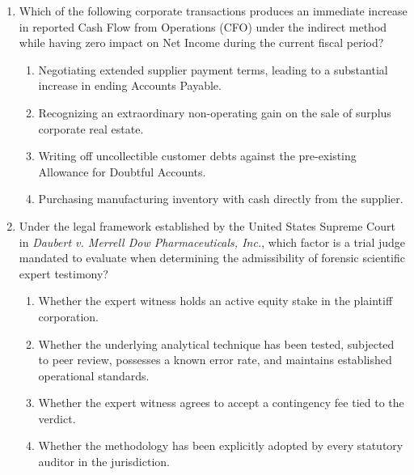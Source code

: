 \begin{enumerate}[label=\textbf{MCQ 3.\arabic*}]
    \item Which of the following corporate transactions produces an immediate increase in reported Cash Flow from Operations (CFO) under the indirect method while having zero impact on Net Income during the current fiscal period?
    \begin{enumerate}[label=(\alph*)]
        \item Negotiating extended supplier payment terms, leading to a substantial increase in ending Accounts Payable.
        \item Recognizing an extraordinary non-operating gain on the sale of surplus corporate real estate.
        \item Writing off uncollectible customer debts against the pre-existing Allowance for Doubtful Accounts.
        \item Purchasing manufacturing inventory with cash directly from the supplier.
    \end{enumerate}

    \item Under the legal framework established by the United States Supreme Court in \textit{Daubert v. Merrell Dow Pharmaceuticals, Inc.}, which factor is a trial judge mandated to evaluate when determining the admissibility of forensic scientific expert testimony?
    \begin{enumerate}[label=(\alph*)]
        \item Whether the expert witness holds an active equity stake in the plaintiff corporation.
        \item Whether the underlying analytical technique has been tested, subjected to peer review, possesses a known error rate, and maintains established operational standards.
        \item Whether the expert witness agrees to accept a contingency fee tied to the verdict.
        \item Whether the methodology has been explicitly adopted by every statutory auditor in the jurisdiction.
    \end{enumerate}
\end{enumerate}
